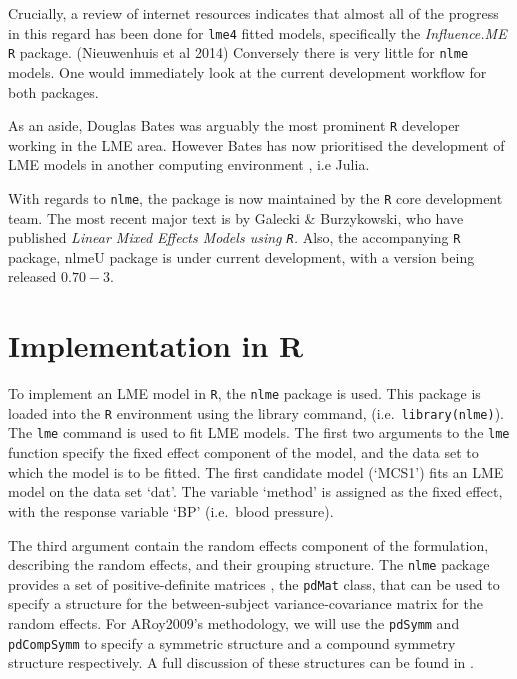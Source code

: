 \documentclass[12pt, a4paper]{report}
\theoremstyle{plain}
\theoremstyle{definition}
\theoremstyle{remark}
\begin{document}
	
	Crucially, a review of internet resources indicates that almost all of the progress in this regard has been done for \texttt{lme4} fitted models, specifically the \textit{Influence.ME} \texttt{R} package. (Nieuwenhuis et al 2014)
	Conversely there is very little for \texttt{nlme} models. One would immediately look at the current development workflow for both packages.
	
	
	As an aside, Douglas Bates was arguably the most prominent \texttt{R} developer working in the LME area. 
	However Bates has now prioritised the development of LME models in another computing environment , i.e Julia. 
	
	
	With regards to \texttt{nlme}, the package is now maintained by the \texttt{R} core development team. The most recent major text is by Galecki \& Burzykowski, who have published \textit{ Linear Mixed Effects Models using \texttt{R}. }
	Also, the accompanying \texttt{R} package, nlmeU package is under current development, with a version being released $0.70-3$.
	
	
	
	\section{Implementation in R}
	To implement an LME model in \texttt{R}, the \texttt{nlme} package is used. This package is loaded into the \texttt{R} environment using the library command, (i.e.\ \texttt{library(nlme)}). The \texttt{lme} command is used to fit LME models. The first two arguments to the \texttt{lme} function specify the fixed effect component of the model, and the data set to which the model is to be fitted. The first candidate model (`MCS1') fits an LME model on the data set `dat'. The variable `method' is assigned as the fixed effect, with the response variable `BP' (i.e.\ blood pressure).
	
	The third argument contain the random effects component of the formulation, describing the random effects, and their grouping structure. The \texttt{nlme} package provides a set of positive-definite matrices , the \texttt{pdMat} class, that can be used to specify a structure for the between-subject variance-covariance matrix for the random effects. For ARoy2009's methodology, we will use the \texttt{pdSymm} and \texttt{pdCompSymm} to specify a symmetric structure and a compound symmetry structure respectively. A full discussion of these structures can be found in \citet[pg. 158]{PB}.
	
\end{document}
